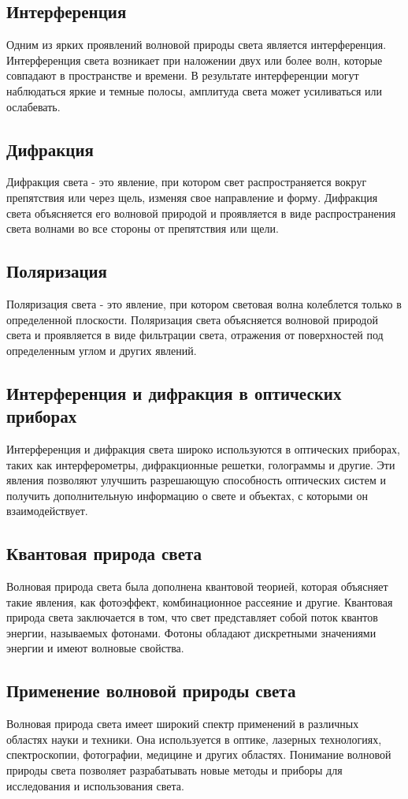 \documentclass{article}
\begin{document}
\subsection{Интерференция}
Одним из ярких проявлений волновой природы света является интерференция. Интерференция света возникает при наложении двух или более волн, которые совпадают в пространстве и времени. В результате интерференции могут наблюдаться яркие и темные полосы, амплитуда света может усиливаться или ослабевать.
\subsection{Дифракция}
Дифракция света - это явление, при котором свет распространяется вокруг препятствия или через щель, изменяя свое направление и форму. Дифракция света объясняется его волновой природой и проявляется в виде распространения света волнами во все стороны от препятствия или щели.
\subsection{Поляризация}
Поляризация света - это явление, при котором световая волна колеблется только в определенной плоскости. Поляризация света объясняется волновой природой света и проявляется в виде фильтрации света, отражения от поверхностей под определенным углом и других явлений.
\subsection{Интерференция и дифракция в оптических приборах}
Интерференция и дифракция света широко используются в оптических приборах, таких как интерферометры, дифракционные решетки, голограммы и другие. Эти явления позволяют улучшить разрешающую способность оптических систем и получить дополнительную информацию о свете и объектах, с которыми он взаимодействует.
\subsection{Квантовая природа света}
Волновая природа света была дополнена квантовой теорией, которая объясняет такие явления, как фотоэффект, комбинационное рассеяние и другие. Квантовая природа света заключается в том, что свет представляет собой поток квантов энергии, называемых фотонами. Фотоны обладают дискретными значениями энергии и имеют волновые свойства.
\subsection{Применение волновой природы света}
Волновая природа света имеет широкий спектр применений в различных областях науки и техники. Она используется в оптике, лазерных технологиях, спектроскопии, фотографии, медицине и других областях. Понимание волновой природы света позволяет разрабатывать новые методы и приборы для исследования и использования света.\\
~\\
\end{document}
